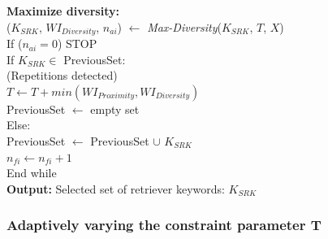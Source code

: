 \begin{algorithm}
\hspace*{6mm}        \textbf{Maximize diversity: } \\ 
\hspace*{6mm}        ($K_{SRK}$, $WI_{Diversity}$, $n_{ai}$) $\leftarrow$ \textit{Max-Diversity}($K_{SRK}$, $T$, $X$) \,\,\,\,\,\,\,\\
\hspace*{6mm}        If ($n_{ai} = 0$)  STOP   \\ 
\hspace*{6mm}        If $K_{SRK} \in $ PreviousSet:  \\ 
\hspace*{10mm}        (Repetitions detected)  \\ 
\hspace*{10mm}        $T \leftarrow T + min (WI_{Proximity}, WI_{Diversity}) $ \\ 
\hspace*{10mm}        PreviousSet $\leftarrow$ empty set  \\ 
\hspace*{6mm}        Else:  \\ 
\hspace*{10mm}        PreviousSet $\leftarrow$ PreviousSet  $\cup$ $K_{SRK}$ \\ 
\hspace*{6mm}        $n_{fi} \leftarrow n_{fi} + 1 $ \\ 
\hspace*{2mm}        End while \\ 
\textbf{Output:} Selected set of retriever keywords: $K_{SRK}$  
\end{algorithm}


\subsubsection{Adaptively varying the constraint parameter T}
\label{sec:adaptAAO}

